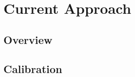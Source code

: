 


\chapter{Current Approach}

\label{chapter:current_appraoch}

\section{Overview}


\section{Calibration}



